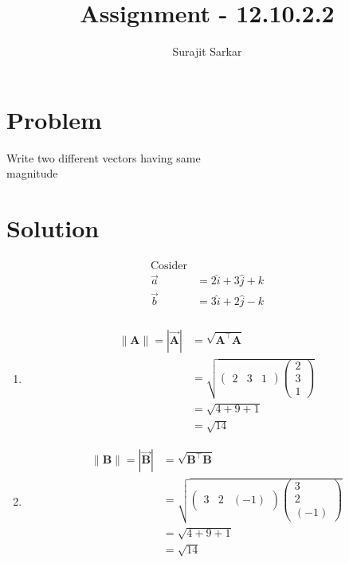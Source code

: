 \documentclass[12pt]{article}
\title{\mytitle}
\title{
Assignment - 12.10.2.2
}
\author{Surajit Sarkar}
\newcommand{\myvec}[1]{\ensuremath{\begin{pmatrix}#1\end{pmatrix}}}
\let\vec\mathbf
\begin{document}
\maketitle
\tableofcontents
\bigskip
\section{\textbf{Problem}}
Write two different vectors having same\\ magnitude
\section{\textbf{Solution}}
\begin{align}
\text{Cosider}\\
\overrightarrow{a} &=2\hat{i}+3\hat{j}+k \\ 
\overrightarrow{b}&=3\hat{i}+2\hat{j}-k\\ 
\end{align}
\begin{enumerate}
    \item 
\begin{align}
\|\vec{A}\|=|\overrightarrow{\vec{A}}|&=\sqrt{\vec{A}^{\top}\vec{A}} \\
&=\sqrt{\myvec{2&3&1}\myvec{2\\3\\1}}\\
&=\sqrt{4+9+1}\\
&=\sqrt{14}
\end{align}
\item
\begin{align}
\|\vec{B}\|=|\overrightarrow{\vec{B}}|&=\sqrt{\vec{B}^{\top}\vec{B}} \\
&=\sqrt{\myvec{3&2&(-1)}\myvec{3\\2\\(-1)}}\\
&=\sqrt{4+9+1}\\
&=\sqrt{14}
\end{align}
\end{enumerate}
\end{document}
